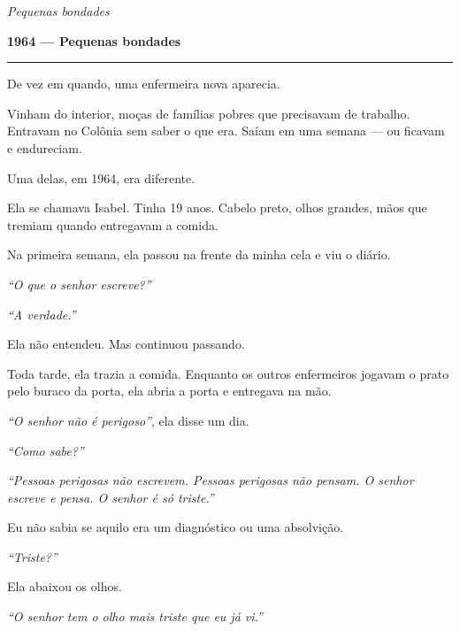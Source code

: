 
\noindent \textit{Pequenas bondades}

\noindent \textbf{1964 --- Pequenas bondades}

\vspace{0.5em}\noindent\rule{\textwidth}{0.5pt}\vspace{0.5em}

\noindent De vez em quando, uma enfermeira nova aparecia.

\noindent Vinham do interior, moças de famílias pobres que precisavam de trabalho. Entravam no Colônia sem saber o que era. Saíam em uma semana --- ou ficavam e endureciam.

\noindent Uma delas, em 1964, era diferente.

\noindent Ela se chamava Isabel. Tinha 19 anos. Cabelo preto, olhos grandes, mãos que tremiam quando entregavam a comida.

\noindent Na primeira semana, ela passou na frente da minha cela e viu o diário.

\noindent \textit{\textquotedblleft{}O que o senhor escreve?\textquotedblright{}}

\noindent \textit{\textquotedblleft{}A verdade.\textquotedblright{}}

\noindent Ela não entendeu. Mas continuou passando.

\noindent Toda tarde, ela trazia a comida. Enquanto os outros enfermeiros jogavam o prato pelo buraco da porta, ela abria a porta e entregava na mão.

\noindent \textit{\textquotedblleft{}O senhor não é perigoso\textquotedblright{}}, ela disse um dia.

\noindent \textit{\textquotedblleft{}Como sabe?\textquotedblright{}}

\noindent \textit{\textquotedblleft{}Pessoas perigosas não escrevem. Pessoas perigosas não pensam. O senhor escreve e pensa. O senhor é só triste.\textquotedblright{}}

\noindent Eu não sabia se aquilo era um diagnóstico ou uma absolvição.

\noindent \textit{\textquotedblleft{}Triste?\textquotedblright{}}

\noindent Ela abaixou os olhos.

\noindent \textit{\textquotedblleft{}O senhor tem o olho mais triste que eu já vi.\textquotedblright{}}

